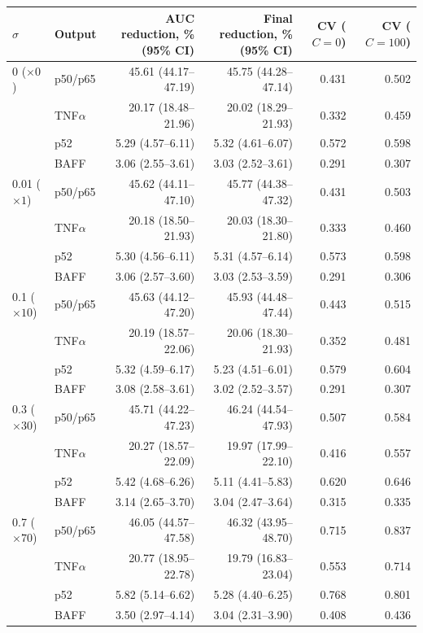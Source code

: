 \begin{tabular*}{\textwidth}{@{\extracolsep{\fill}}llrrrr@{}}
\toprule
$\sigma$ & Output & AUC reduction, \% (95\% CI) & Final reduction, \% (95\% CI) & CV ($C=0$) & CV ($C=100$) \\
\midrule
0 ($\times0$) & p50/p65 & 45.61 (44.17--47.19) & 45.75 (44.28--47.14) & 0.431 & 0.502 \\
 & TNF$\alpha$ & 20.17 (18.48--21.96) & 20.02 (18.29--21.93) & 0.332 & 0.459 \\
 & p52 & 5.29 (4.57--6.11) & 5.32 (4.61--6.07) & 0.572 & 0.598 \\
 & BAFF & 3.06 (2.55--3.61) & 3.03 (2.52--3.61) & 0.291 & 0.307 \\
0.01 ($\times1$) & p50/p65 & 45.62 (44.11--47.10) & 45.77 (44.38--47.32) & 0.431 & 0.503 \\
 & TNF$\alpha$ & 20.18 (18.50--21.93) & 20.03 (18.30--21.80) & 0.333 & 0.460 \\
 & p52 & 5.30 (4.56--6.11) & 5.31 (4.57--6.14) & 0.573 & 0.598 \\
 & BAFF & 3.06 (2.57--3.60) & 3.03 (2.53--3.59) & 0.291 & 0.306 \\
0.1 ($\times10$) & p50/p65 & 45.63 (44.12--47.20) & 45.93 (44.48--47.44) & 0.443 & 0.515 \\
 & TNF$\alpha$ & 20.19 (18.57--22.06) & 20.06 (18.30--21.93) & 0.352 & 0.481 \\
 & p52 & 5.32 (4.59--6.17) & 5.23 (4.51--6.01) & 0.579 & 0.604 \\
 & BAFF & 3.08 (2.58--3.61) & 3.02 (2.52--3.57) & 0.291 & 0.307 \\
0.3 ($\times30$) & p50/p65 & 45.71 (44.22--47.23) & 46.24 (44.54--47.93) & 0.507 & 0.584 \\
 & TNF$\alpha$ & 20.27 (18.57--22.09) & 19.97 (17.99--22.10) & 0.416 & 0.557 \\
 & p52 & 5.42 (4.68--6.26) & 5.11 (4.41--5.83) & 0.620 & 0.646 \\
 & BAFF & 3.14 (2.65--3.70) & 3.04 (2.47--3.64) & 0.315 & 0.335 \\
0.7 ($\times70$) & p50/p65 & 46.05 (44.57--47.58) & 46.32 (43.95--48.70) & 0.715 & 0.837 \\
 & TNF$\alpha$ & 20.77 (18.95--22.78) & 19.79 (16.83--23.04) & 0.553 & 0.714 \\
 & p52 & 5.82 (5.14--6.62) & 5.28 (4.40--6.25) & 0.768 & 0.801 \\
 & BAFF & 3.50 (2.97--4.14) & 3.04 (2.31--3.90) & 0.408 & 0.436 \\
\bottomrule
\end{tabular*}

